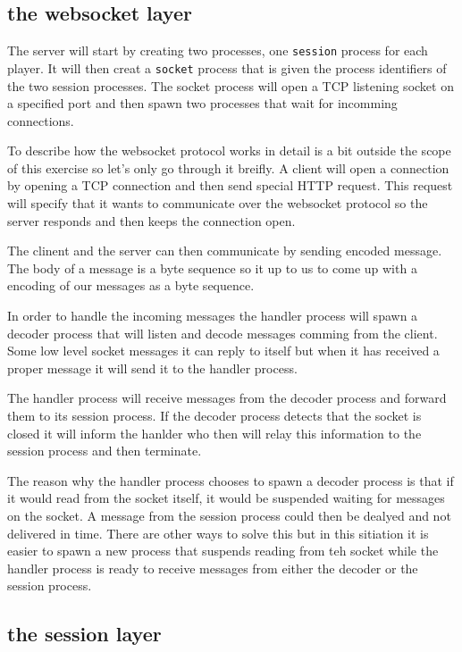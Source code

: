 \documentclass[a4paper,11pt]{article}
\begin{document}
\subsection*{the websocket layer}

The server will start by creating two processes, one {\tt session}
process for each player. It will then creat a {\tt socket} process
that is given the process identifiers of the two session
processes. The socket process will open a TCP listening socket on a
specified port and then spawn two processes that wait for incomming
connections.

To describe how the websocket protocol works in detail is a bit outside
the scope of this exercise so let's only go through it breifly. A
client will open a connection by opening a TCP connection and then
send special HTTP request. This request will specify that it wants to
communicate over the websocket protocol so the server responds and
then keeps the connection open.

The clinent and the server can then communicate by sending encoded
message. The body of a message is a byte sequence so it up to us to
come up with a encoding of our messages as a byte sequence.

In order to handle the incoming messages the handler process will
spawn a decoder process that will listen and decode messages comming
from the client. Some low level socket messages it can reply to itself
but when it has received a proper message it will send it to the
handler process.

The handler process will receive messages from the decoder process and
forward them to its session process. If the decoder process detects
that the socket is closed it will inform the hanlder who then will
relay this information to the session process and then terminate.

The reason why the handler process chooses to spawn a decoder process
is that if it would read from the socket itself, it would be suspended
waiting for messages on the socket. A message from the session process
could then be dealyed and not delivered in time. There are other ways
to solve this but in this sitiation it is easier to spawn a new
process that suspends reading from teh socket while the handler
process is ready to receive messages from either the decoder or the
session process.

\subsection*{the session layer}
\end{document}
